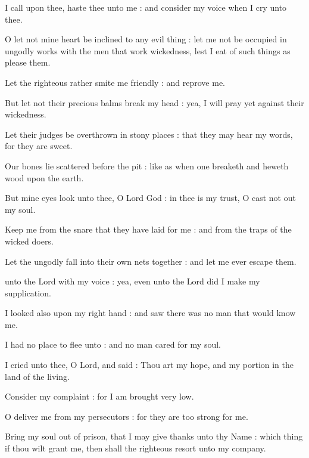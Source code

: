 
 I call upon thee, haste thee unto me : and consider my voice when I cry unto thee.\par
{}
O let not mine heart be inclined to any evil thing : let me not be occupied in ungodly works with the men that work wickedness, lest I eat of such things as please them.\par
{}Let the righteous rather smite me friendly : and reprove me.\par
{}But let not their precious balms break my head : yea, I will pray yet against their wickedness.\par
{}Let their judges be overthrown in stony places : that they may hear my words, for they are sweet.\par
{}Our bones lie scattered before the pit : like as when one breaketh and heweth wood upon the earth.\par
{}But mine eyes look unto thee, O Lord God : in thee is my trust, O cast not out my soul.\par
{}Keep me from the snare that they have laid for me : and from the traps of the wicked doers.\par
{}Let the ungodly fall into their own nets together : and let me ever escape them.\par



 unto the Lord with my voice : yea, even unto the Lord did I make my supplication.\par
{}
I looked also upon my right hand : and saw there was no man that would know me.\par
{}I had no place to flee unto : and no man cared for my soul.\par
{}I cried unto thee, O Lord, and said : Thou art my hope, and my portion in the land of the living.\par
{}Consider my complaint : for I am brought very low.\par
{}O deliver me from my persecutors : for they are too strong for me.\par
{}Bring my soul out of prison, that I may give thanks unto thy Name : which thing if thou wilt grant me, then shall the righteous resort unto my company.\par

